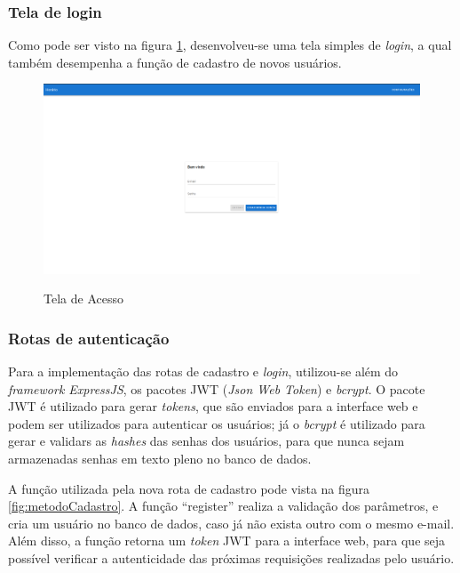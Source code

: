 \subsubsection{Tela de login}
Como pode ser visto na figura \ref{fig:login}, desenvolveu-se uma tela simples de \textit{login}, a qual também desempenha a função de cadastro de novos usuários.

\begin{figure}[!htb]
	\centering
	\caption{Tela de Acesso}
	\includegraphics[width=1\textwidth]{./dados/figuras/telaLogin}
	\label{fig:login}
\end{figure}
\pagebreak

\subsubsection{Rotas de autenticação}
Para a implementação das rotas de cadastro e \textit{login}, utilizou-se além do \textit{framework ExpressJS}, os pacotes JWT (\textit{Json Web Token}) e \textit{bcrypt}. O pacote JWT é utilizado para gerar \textit{tokens}, que são enviados para a interface web e podem ser utilizados para autenticar os usuários; já o \textit{bcrypt} é utilizado para gerar e validars as \textit{hashes} das senhas dos usuários, para que nunca sejam armazenadas senhas em texto pleno no banco de dados.

A função utilizada pela nova rota de cadastro pode vista na figura \ref{fig:metodoCadastro}. A função ``register'' realiza a validação dos parâmetros, e cria um usuário no banco de dados, caso já não exista outro com o mesmo e-mail. Além disso, a função retorna um \textit{token} JWT para a interface web, para que seja possível verificar a autenticidade das próximas requisições realizadas pelo usuário. 


